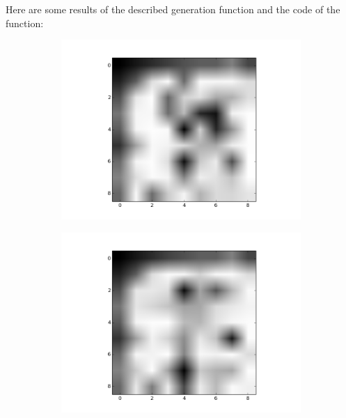 \documentclass{article}
\begin{document}
Here are some results of the described generation function and the code of the function:

\begin{figure}[ht]
        \centering
        \begin{subfigure}[b]{0.5\textwidth}
                \includegraphics[width=\textwidth]{../new3nB_1.png}
        \end{subfigure}%
        \begin{subfigure}[b]{0.5\textwidth}
                \includegraphics[width=\textwidth]{../new3nB_2.png}
        \end{subfigure}
        \begin{subfigure}[b]{0.5\textwidth}

\end{subfigure}
\end{figure}
\end{document}
